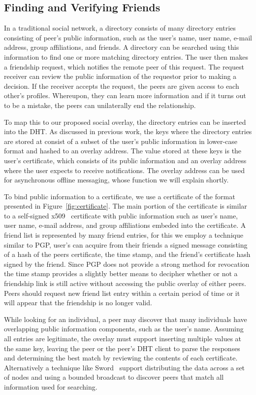 \documentclass[letterpaper,twocolumn,10pt]{article}
\begin{document}
\subsection{Finding and Verifying Friends}
In a traditional social network, a directory consists of many directory entries
consisting of peer's public information, such as the user's name, user name,
e-mail address, group affiliations, and friends.  A directory can be searched
using this information to find one or more matching directory entries.  The user
then makes a friendship request, which notifies the remote peer of this request.
The request receiver can review the public information of the requestor prior to
making a decision.  If the receiver accepts the request, the peers are given
access to each other's profiles.  Whereupon, they can learn more information
and if it turns out to be a mistake, the peers can unilaterally end the
relationship.

To map this to our proposed social overlay, the directory entries can be
inserted into the DHT.  As discussed in previous work, the keys where the
directory entries are stored at consist of a subset of the user's public
information in lower-case format and hashed to an overlay  address.  The value
stored at these keys is the user's certificate, which consists of its public
information and an overlay address where the user expects to receive
notifications.  The overlay address can be used for asynchronous offline
messaging, whose function we will explain shortly.

To bind public information to a certificate, we use a certificate of the format
presented in Figure~\ref{fig:certificate}.  The main portion of the certificate is 
similar to a self-signed x509~\cite{x509} certificate with public information
such as user's name, user name, e-mail address, and group affiliations embeded
into the certificate.  A friend list is represented by many friend entries, for
this we employ a technique similar to PGP, user's can acquire from their friends
a signed message consisting of a hash of the peers certificate, the time stamp,
and the friend's certificate hash signed by the friend.  Since PGP does not
provide a strong method for revocation the time stamp provides a slightly better
means to decipher whether or not a friendship link is still active without
accessing the public overlay of either peers.  Peers should request new friend
list entry within a certain period of time or it will appear that the friendship
is no longer valid.

While looking for an individual, a peer may discover that many individuals have
overlapping public information components, such as the user's name.  Assuming
all entries are legitimate, the overlay must support inserting multiple values
at the same key, leaving the peer or the peer's DHT client to parse the
responses and determining the best match by reviewing the contents of each
certificate.  Alternatively a technique like Sword~\cite{sword} support
distributing the data across a set of nodes and using a bounded broadcast to
discover peers that match all information used for searching.
\end{document}
